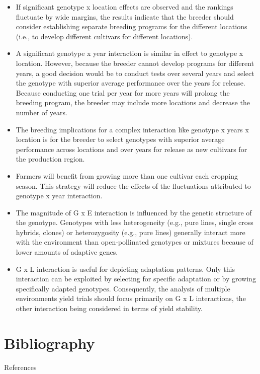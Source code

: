 \documentclass[11pt,dvipsnames,ignorenonframetext,aspectratio=169]{beamer}
\providecommand{\tightlist}{%
  \setlength{\itemsep}{0pt}\setlength{\parskip}{0pt}}
\begin{document}
\begin{frame}{}
\protect\hypertarget{section-8}{}

\small

\begin{itemize}
\tightlist
\item
  If significant genotype x location effects are observed and the
  rankings fluctuate by wide margins, the results indicate that the
  breeder should consider establishing separate breeding programs for
  the different locations (i.e., to develop different cultivars for
  different locations).
\item
  A significant genotype x year interaction is similar in effect to
  genotype x location. However, because the breeder cannot develop
  programs for different years, a good decision would be to conduct
  tests over several years and select the genotype with superior average
  performance over the years for release. Because conducting one trial
  per year for more years will prolong the breeding program, the breeder
  may include more locations and decrease the number of years.
\item
  The breeding implications for a complex interaction like genotype x
  years x location is for the breeder to select genotypes with superior
  average performance across locations and over years for release as new
  cultivars for the production region.
\end{itemize}

\end{frame}

\begin{frame}{}
\protect\hypertarget{section-9}{}

\small

\begin{itemize}
\tightlist
\item
  Farmers will benefit from growing more than one cultivar each cropping
  season. This strategy will reduce the effects of the fluctuations
  attributed to genotype x year interaction.
\item
  The magnitude of G x E interaction is influenced by the genetic
  structure of the genotype. Genotypes with less heterogeneity (e.g.,
  pure lines, single cross hybrids, clones) or heterozygosity (e.g.,
  pure lines) generally interact more with the environment than
  open-pollinated genotypes or mixtures because of lower amounts of
  adaptive genes.
\item
  G x L interaction is useful for depicting adaptation patterns. Only
  this interaction can be exploited by selecting for specific adaptation
  or by growing specifically adapted genotypes. Consequently, the
  analysis of multiple environments yield trials should focus primarily
  on G x L interactions, the other interaction being considered in terms
  of yield stability.
\end{itemize}

\end{frame}

\hypertarget{bibliography}{%
\section{Bibliography}\label{bibliography}}

\begin{frame}{References}
\protect\hypertarget{references}{}

\end{frame}
\end{document}
